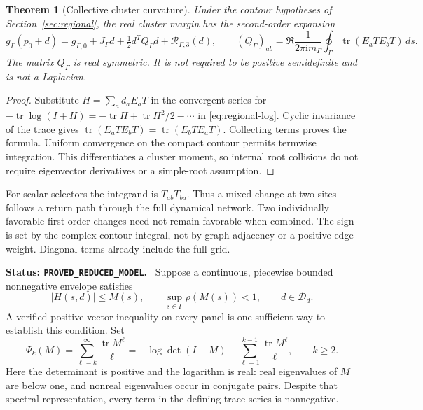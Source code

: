 \documentclass[11pt]{article}
\newtheorem{theorem}{Theorem}
\newcommand{\ii}{\mathrm{i}}
\newcommand{\status}[1]{\par\smallskip\noindent\textbf{Status: \texttt{#1}.}\ }
\begin{document}
\begin{theorem}[Collective cluster curvature]
Under the contour hypotheses of Section~\ref{sec:regional}, the real
cluster margin has the second-order expansion
\begin{equation}
 g_\Gamma(p_0+d)=g_{\Gamma,0}+J_\Gamma d+
       \tfrac12d^TQ_\Gamma d+\mathcal R_{\Gamma,3}(d),\qquad
 (Q_\Gamma)_{ab}=
 \Re\frac{1}{2\pi\ii m_\Gamma}
       \oint_\Gamma\operatorname{tr}(E_aTE_bT)\,ds .
 \label{eq:collective-hessian}
\end{equation}
The matrix $Q_\Gamma$ is real symmetric. It is not required to be
positive semidefinite and is not a Laplacian.
\end{theorem}
\begin{proof}
Substitute $H=\sum_a d_aE_aT$ in the convergent series for
$-\operatorname{tr}\log(I+H)=-\operatorname{tr}H+
\operatorname{tr}H^2/2-\cdots$ in \eqref{eq:regional-log}.
Cyclic invariance of the trace gives
$\operatorname{tr}(E_aTE_bT)=\operatorname{tr}(E_bTE_aT)$.
Collecting terms proves the formula. Uniform convergence on the
compact contour permits termwise integration. This differentiates a
cluster moment, so internal root collisions do not require eigenvector
derivatives or a simple-root assumption.
\end{proof}
For scalar selectors the integrand is $T_{ab}T_{ba}$.
Thus a mixed change at two sites follows a return path through the
full dynamical network. Two individually favorable first-order
changes need not remain favorable when combined. The sign is set by
the complex contour integral, not by graph adjacency or a positive
edge weight. Diagonal terms already include the full grid.

\status{PROVED\_REDUCED\_MODEL}
Suppose a continuous, piecewise bounded nonnegative envelope satisfies
\[
 |H(s,d)|\le M(s),\qquad
 \sup_{s\in\Gamma}\rho(M(s))<1,\qquad d\in\mathcal D_d .
\]
A verified positive-vector inequality on every panel is one sufficient
way to establish this condition. Set
\[
 \Psi_k(M)=\sum_{\ell=k}^{\infty}\frac{\operatorname{tr}M^\ell}{\ell}
 =-\log\det(I-M)-
     \sum_{\ell=1}^{k-1}\frac{\operatorname{tr}M^\ell}{\ell},
 \qquad k\ge2 .
\]
Here the determinant is positive and the logarithm is real: real
eigenvalues of $M$ are below one, and nonreal eigenvalues occur in
conjugate pairs. Despite that spectral representation, every term in
the defining trace series is nonnegative.
\end{document}
